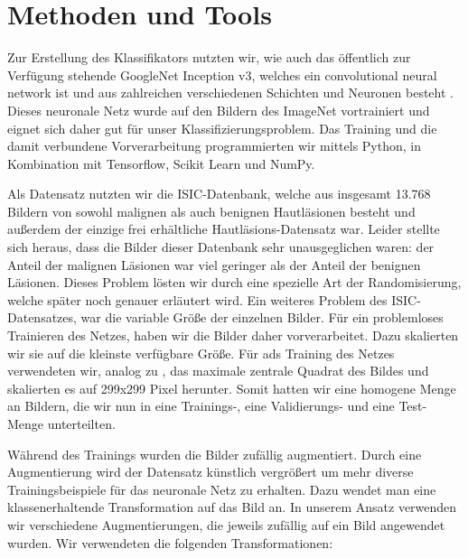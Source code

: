 \section{Methoden und Tools}

Zur Erstellung des Klassifikators nutzten wir, wie \citet{esteva2017dermatologist} auch das öffentlich zur Verfügung stehende GoogleNet Inception v3, welches ein convolutional neural network ist und aus zahlreichen verschiedenen Schichten und Neuronen besteht \citep{szegedy2016rethinking} . Dieses neuronale Netz wurde auf den Bildern des ImageNet vortrainiert \citep{russakovsky2015imagenet} und eignet sich daher gut für unser Klassifizierungsproblem.  Das Training und die damit verbundene Vorverarbeitung programmierten wir mittels Python, in Kombination mit Tensorflow, Scikit Learn und NumPy. 

Als Datensatz nutzten wir die ISIC-Datenbank, welche aus insgesamt 13.768 Bildern von sowohl malignen als auch benignen Hautläsionen besteht und außerdem der einzige frei erhältliche Hautläsions-Datensatz war. Leider stellte sich heraus, dass die Bilder dieser Datenbank sehr unausgeglichen waren: der Anteil der malignen Läsionen war viel geringer als der Anteil der benignen Läsionen. Dieses Problem lösten wir durch eine spezielle Art der Randomisierung, welche später noch genauer erläutert wird. Ein weiteres Problem des ISIC-Datensatzes, war die variable Größe der einzelnen Bilder. Für ein problemloses Trainieren des Netzes, haben wir die Bilder daher vorverarbeitet. Dazu skalierten wir sie auf die kleinste verfügbare Größe. Für ads Training des Netzes verwendeten wir, analog zu \citep{esteva2017dermatologist}, das maximale zentrale Quadrat des Bildes und skalierten es auf 299x299 Pixel herunter. Somit hatten wir eine homogene Menge an Bildern, die wir nun in eine Trainings-, eine Validierungs- und eine Test-Menge unterteilten.

Während des Trainings wurden die Bilder zufällig augmentiert. Durch eine Augmentierung wird der Datensatz künstlich vergrößert um mehr diverse Trainingsbeispiele für das neuronale Netz zu erhalten. Dazu wendet man eine klassenerhaltende Transformation auf das Bild an. In unserem Ansatz verwenden wir verschiedene Augmentierungen, die jeweils zufällig auf ein Bild angewendet wurden. Wir verwendeten die folgenden Transformationen:

